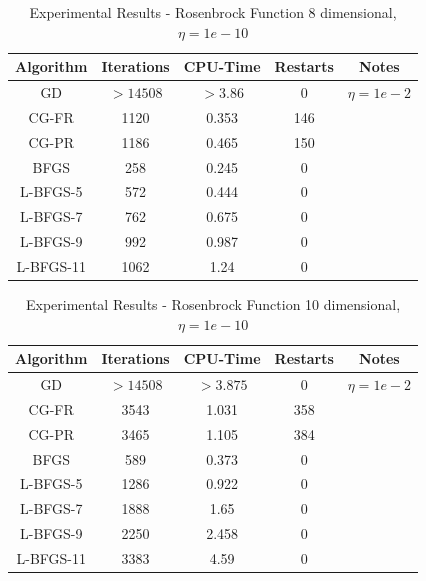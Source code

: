 \documentclass[12pt]{amsart}
\begin{document}
\begin{table}
\caption{Experimental Results - Rosenbrock Function 8 dimensional, $\eta=1e-10$}
\label{results_rosenbrock_8}
\begin{center}
\begin{tabular}{|c||c||c||c||c|}
\hline
Algorithm & Iterations & CPU-Time & Restarts & Notes\\
\hline
GD & $>14508$ & $>3.86$& 0  & $\eta=1e-2$ \\
\hline
CG-FR & 1120 & 0.353 & 146 & \\
\hline
CG-PR & 1186 & 0.465 & 150 & \\
\hline
BFGS & 258 & 0.245 & 0 & \\
\hline
L-BFGS-5 & 572 & 0.444 & 0 &\\
\hline
L-BFGS-7 & 762 & 0.675 & 0 &\\
\hline
L-BFGS-9 & 992 & 0.987 & 0 &\\
\hline
L-BFGS-11 & 1062 & 1.24 & 0 &\\
\hline
\end{tabular}
\end{center}
\end{table}

\begin{table}
\caption{Experimental Results - Rosenbrock Function 10 dimensional, $\eta=1e-10$}
\label{results_rosenbrock_10}
\begin{center}
\begin{tabular}{|c||c||c||c||c|}
\hline
Algorithm & Iterations & CPU-Time & Restarts & Notes\\
\hline
GD & $>14508$ & $>3.875$ & 0 & $\eta=1e-2$ \\
\hline
CG-FR & 3543 & 1.031 & 358 & \\
\hline
CG-PR & 3465 & 1.105 & 384 & \\
\hline
BFGS & 589 & 0.373 & 0 & \\
\hline
L-BFGS-5 & 1286 & 0.922 & 0 &\\
\hline
L-BFGS-7 & 1888 & 1.65 & 0 &\\
\hline
L-BFGS-9 & 2250 & 2.458 & 0 &\\
\hline
L-BFGS-11 & 3383 & 4.59 & 0 &\\
\hline
\end{tabular}
\end{center}
\end{table}
\end{document}
